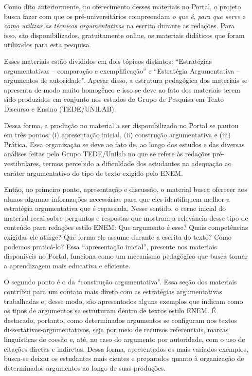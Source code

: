 \documentclass{textolivre}
\begin{document}
Como dito anteriormente, no oferecimento desses materiais no Portal, o projeto busca fazer com que os pré-universitários compreendam \emph{o que é}, \emph{para que serve} e \emph{como utilizar as técnicas argumentativas} na escrita durante as redações. Para isso, são disponibilizados, gratuitamente online, os materiais didáticos que foram utilizados para esta pesquisa.

Esses materiais estão divididos em dois tópicos distintos: “Estratégias argumentativas – comparação e exemplificação” e “Estratégia Argumentativa – argumentos de autoridade”. Apesar disso, a estrutura pedagógica dos materiais se apresenta de modo muito homogêneo e isso se deve ao fato dos materiais terem sido produzidos em conjunto nos estudos do Grupo de Pesquisa em Texto Discurso e Ensino (TEDE/UNILAB).

Dessa forma, a produção no material a ser disponibilizado no Portal se pautou em três pontos: (i) apresentação inicial, (ii) construção argumentativa e (iii) Prática. Essa organização se deve ao fato de, ao longo dos estudos e das diversas análises feitas pelo Grupo TEDE/Unilab no que se refere às redações pré-vestibulares, termos percebido a dificuldade dos estudantes na adequação ao caráter argumentativo do tipo de texto exigido pelo ENEM.

Então, no primeiro ponto, apresentação e discussão, o material busca oferecer aos alunos algumas informações necessárias para que eles identifiquem melhor a estratégia argumentativa que é repassada. Nesse sentido, o cerne inicial do material recai sobre perguntas e respostas que mostram a relevância desse tipo de conteúdo para redações estilo ENEM: Que argumento é esse? Quais competências exigidas ele atinge? Que forma ele assume durante a escrita do texto? Como podemos praticá-lo? Essa “apresentação inicial”, presente nos materiais disponíveis no Portal, funciona como um mecanismo pedagógico que busca tornar a aprendizagem mais educativa e eficiente.

O segundo ponto é o da “construção argumentativa”. Essa seção dos materiais contribui para um contato mais direto com as estratégias argumentativas trabalhadas e, desse modo, são apresentados alguns exemplos que indicam como os tipos de argumentos se estruturam dentro de textos estilo ENEM. É destacado, portanto, como determinados argumentos se configuram nos textos dissertativos-argumentativos, seja por meio de recursos referenciais, marcas linguísticas de coesão e, até, no caso do argumento por autoridade, com o uso de citações diretas e indiretas. Dessa forma, apresentados os mais variados exemplos, busca-se deixar os estudantes mais cientes e preparados quanto à organização de determinados argumentos ao longo de suas produções.
\end{document}

